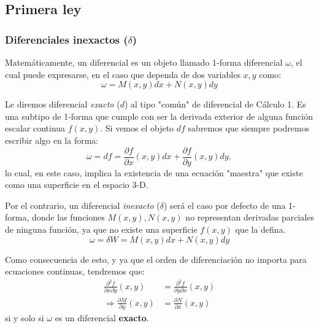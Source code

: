 \documentclass[]{article}
\numberwithin{equation}{section}
\newcommand{\0}{\textcolor{gray}{0}}
\begin{document}


\subsection{Primera ley}
\subsubsection{Diferenciales inexactos ($\delta$)}
Matemáticamente, un diferencial es un objeto llamado 1-forma diferencial $\omega$, el cual puede expresarse, en el caso que dependa de dos variables $x, y$ como:
\begin{equation}
	\omega = M(x,y)dx + N(x,y)dy
\end{equation}

Le diremos diferencial \textit{exacto} ($d$) al tipo "común" de diferencial de Cálculo 1. Es una subtipo de 1-forma que cumple con ser la derivada exterior de alguna función escalar continua $f(x,y)$. Si vemos el objeto $df$ sabremos que siempre podremos escribir algo en la forma:
\begin{equation}
	\omega = df = \frac{\partial f}{\partial x}(x,y)dx  + \frac{\partial f}{\partial y}(x,y)dy,
	\label{eqn:def_dif_exacto}
\end{equation}
lo cual, en este caso, implica la existencia de una ecuación "maestra" que existe como una superficie en el espacio 3-D.

Por el contrario, un diferencial \textit{inexacto} ($\delta$) será el caso por defecto de una 1-forma, donde las funciones $M(x,y), N(x,y)$ no representan derivadas parciales de ninguna función, ya que no existe una superficie $f(x,y)$ que la defina.
\begin{equation}
	\omega = \delta W = M(x,y)dx + N(x,y)dy
\end{equation}

Como consecuencia de esto, y ya que el orden de diferenciación no importa para ecuaciones continuas, tendremos que:
\begin{align}
	\frac{\partial^2 f}{\partial x\partial y}(x,y) &= \frac{\partial^2 f}{\partial y\partial x}(x,y)\label{eqn:orden_dif}\\
	\Rightarrow \frac{\partial M}{\partial y}(x,y) &= \frac{\partial N}{\partial x}(x,y)\label{eqn:orden_dif2}
\end{align}
si y solo si $\omega$ es un diferencial \textbf{exacto}.
\end{document}
